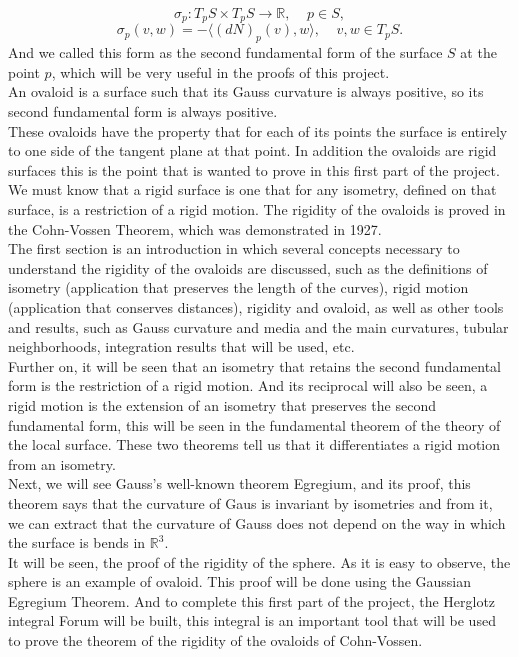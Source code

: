 $$ \sigma_p : T_pS \times T_pS \to \mathbb{R}, \;\;\;\; p \in S, $$
$$ \sigma_p(v,w) = - \langle (dN)_p(v), w \rangle, \;\;\;\; v,w \in T_pS. $$
And we called this form as the second fundamental form of the surface $S$ at the point $p$, which will be very useful in the proofs of this project.
${ }$\\

An ovaloid is a surface such that its Gauss curvature is always positive, so its second fundamental form is always positive.
${ }$\\

These ovaloids have the property that for each of its points the surface is entirely to one side of the tangent plane at that point. In addition the ovaloids are rigid surfaces this is the point that is wanted to prove in this first part of the project. We must know that a rigid surface is one that for any isometry, defined on that surface, is a restriction of a rigid motion. The rigidity of the ovaloids is proved in the Cohn-Vossen Theorem, which was demonstrated in 1927.
${ }$\\

The first section is an introduction in which several concepts necessary to understand the rigidity of the ovaloids are discussed, such as the definitions of isometry (application that preserves the length of the curves), rigid motion (application that conserves distances), rigidity and ovaloid, as well as other tools and results, such as Gauss curvature and media and the main curvatures, tubular neighborhoods, integration results that will be used, etc.
${ }$\\

Further on, it will be seen that an isometry that retains the second fundamental form is the restriction of a rigid motion. And its reciprocal will also be seen, a rigid motion is the extension of an isometry that preserves the second fundamental form, this will be seen in the fundamental theorem of the theory of the local surface. These two theorems tell us that it differentiates a rigid motion from an isometry.
${ }$\\

Next, we will see Gauss's well-known theorem Egregium, and its proof, this theorem says that the curvature of Gaus is invariant by isometries and from it, we can extract that the curvature of Gauss does not depend on the way in which the surface is bends in $\mathbb{R}^3$.
${ }$\\

It will be seen, the proof of the rigidity of the sphere. As it is easy to observe, the sphere is an example of ovaloid. This proof will be done using the Gaussian Egregium Theorem. And to complete this first part of the project, the Herglotz integral Forum will be built, this integral is an important tool that will be used to prove the theorem of the rigidity of the ovaloids of Cohn-Vossen.
${ }$\\

